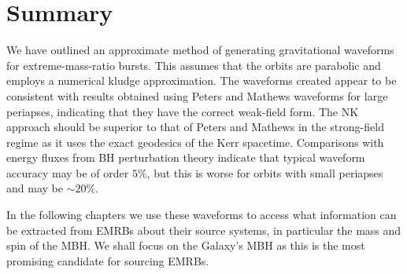\section{Summary}

We have outlined an approximate method of generating gravitational waveforms for extreme-mass-ratio bursts. This assumes that the orbits are parabolic and employs a numerical kludge approximation. The waveforms created appear to be consistent with results obtained using Peters and Mathews waveforms for large periapses, indicating that they have the correct weak-field form. The NK approach should be superior to that of Peters and Mathews in the strong-field regime as it uses the exact geodesics of the Kerr spacetime. Comparisons with energy fluxes from BH perturbation theory indicate that typical waveform accuracy may be of order $5\%$, but this is worse for orbits with small periapses and may be $\sim 20\%$.

In the following chapters we use these waveforms to access what information can be extracted from EMRBs about their source systems, in particular the mass and spin of the MBH. We shall focus on the Galaxy's MBH as this is the most promising candidate for sourcing EMRBs.

